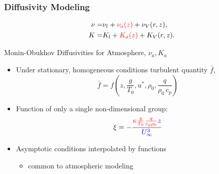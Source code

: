 \documentclass[mathserif]{beamer}
\begin{document}
%
%
%
\begin{frame}
\frametitle{Diffusivity Modeling}
 



   

  \begin{eqnarray*}
    \nu =& \nu_{l} + \textcolor{red}{\nu_{a}(z)} + \nu_{V}(r,z), \\
    K =& K_{l} + \textcolor{red}{K_{a}(z)} + K_{V}(r,z).
  \end{eqnarray*}

  \begin{block}{Monin-Obukhov Diffusivities for Atmosphere, $\nu_{a},K_{a}$}
    \begin{itemize}
    \item Under stationary, homogeneous conditions turbulent quantity $\bar f$, 
      \begin{equation}
        \bar f = f(z,\frac{g}{T_0},u^*,\rho_0,\frac{q}{\rho_0 \, c_p})
      \end{equation}
    \item Function of only a single non-dimensional group: 
      \begin{equation}
        \xi = -\frac{\textcolor{red}{\kappa \frac{g}{T_0} \frac{q}{c_p \rho_0}} \textcolor{blue}{z}}{ \textcolor{blue}{{U_{\infty}^3}}}
      \end{equation}
    \item Asymptotic conditions interpolated by functions 
    \begin{itemize}
    \item common to atmospheric modeling
    \end{itemize}
    \end{itemize}
  \end{block}
  
\end{frame}
\end{document}
